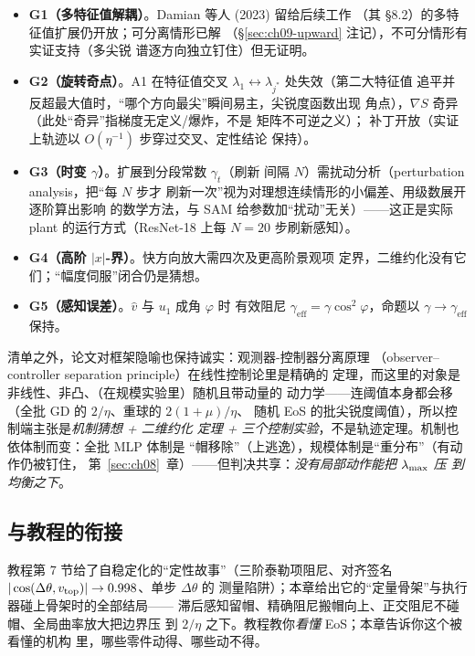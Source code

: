 \begin{itemize}
  \item \textbf{G1（多特征值解耦）}。Damian 等人 (2023) 留给后续工作
        （其 \S8.2）的多特征值扩展仍开放；可分离情形已解
        （\S\ref{sec:ch09-upward} 注记），不可分情形有实证支持（多尖锐
        谱逐方向独立钉住）但无证明。
  \item \textbf{G2（旋转奇点）}。A1 在特征值交叉
        $\lambda_1\leftrightarrow\lambda_{j^*}$ 处失效（第二大特征值
        追平并反超最大值时，“哪个方向最尖”瞬间易主，尖锐度函数出现
        角点），$\nabla S$ 奇异（此处“奇异”指梯度无定义/爆炸，不是
        矩阵不可逆之义）；
        补丁开放（实证上轨迹以 $O(\eta^{-1})$ 步穿过交叉、定性结论
        保持）。
  \item \textbf{G3（时变 $\gamma$）}。扩展到分段常数 $\gamma_t$（刷新
        间隔 $N$）需扰动分析（perturbation analysis，把“每 $N$ 步才
        刷新一次”视为对理想连续情形的小偏差、用级数展开逐阶算出影响
        的数学方法，与 SAM 给参数加“扰动”无关）——这正是实际 plant 的运行方式（ResNet-18
        上每 $N=20$ 步刷新感知）。
  \item \textbf{G4（高阶 $|x|$-界）}。快方向放大需四次及更高阶景观项
        定界，二维约化没有它们；“幅度伺服”闭合仍是猜想。
  \item \textbf{G5（感知误差）}。$\hat v$ 与 $u_1$ 成角 $\varphi$ 时
        有效阻尼 $\gamma_{\mathrm{eff}}=\gamma\cos^2\varphi$，命题以
        $\gamma\to\gamma_{\mathrm{eff}}$ 保持。
\end{itemize}

清单之外，论文对框架隐喻也保持诚实：观测器-控制器分离原理
（observer--controller separation principle）在线性控制论里是精确的
定理，而这里的对象是非线性、非凸、（在规模实验里）随机且带动量的
动力学——连阈值本身都会移（全批 GD 的 $2/\eta$、重球的 $2(1+\mu)/\eta$、
随机 EoS 的批尖锐度阈值），所以控制端主张是\emph{机制猜想 + 二维约化
定理 + 三个控制实验}，不是轨迹定理。机制也依体制而变：全批 MLP 体制是
“帽移除”（上逃逸），规模体制是“重分布”（有动作仍被钉住，
第~\ref{sec:ch08}~章）——但判决共享：\emph{没有局部动作能把 $\lambda_{\max}$ 压
到均衡之下}。

\subsection{与教程的衔接}\label{sec:ch09-tutorial}

教程第 7 节给了自稳定化的“定性故事”（三阶泰勒项阻尼、对齐签名
$|\cos(\Delta\theta,v_{\mathrm{top}})|\to0.998$、单步 $\Delta\theta$ 的
测量陷阱）；本章给出它的“定量骨架”与执行器碰上骨架时的全部结局——
滞后感知留帽、精确阻尼搬帽向上、正交阻尼不碰帽、全局曲率放大把边界压
到 $2/\eta$ 之下。教程教你\emph{看懂} EoS；本章告诉你这个被看懂的机构
里，哪些零件动得、哪些动不得。

